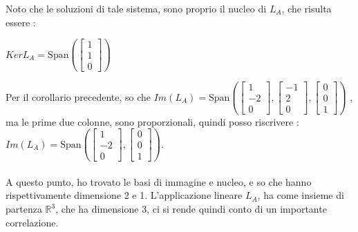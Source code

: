 \documentclass[12pt, letterpaper]{article}
\newcommand{\R}{{\mathbb R}}
\newcommand{\acc}{\\\hphantom{}\\}
\newcommand{\Span}{{\text{Span}}}
\begin{document}
Noto che le soluzioni di tale sistema, sono proprio il nucleo di \(L_A\), che risulta essere : \begin{center}\(KerL_A=\Span(\begin{bmatrix}
    1\\1\\0
\end{bmatrix})\)\end{center}
Per il corollario precedente, so che \(Im(L_A)=\Span(
    \begin{bmatrix} 1\\-2\\0 \end{bmatrix},
    \begin{bmatrix} -1\\2\\0 \end{bmatrix},
    \begin{bmatrix} 0\\0\\1 \end{bmatrix})\)
, ma le prime due colonne, sono proporzionali, quindi posso riscrivere : \(Im(L_A)=\Span(
    \begin{bmatrix} 1\\-2\\0 \end{bmatrix},
    \begin{bmatrix} 0\\0\\1 \end{bmatrix})\).\acc 
A questo punto, ho trovato le basi di immagine e nucleo, e so che hanno rispettivamente 
dimensione 2 e 1. L'applicazione lineare \(L_A\), ha come insieme di partenza \(\R^3\), che ha dimensione 3, ci si rende 
quindi conto di un importante correlazione.
\end{document}
